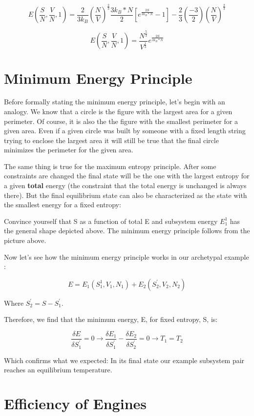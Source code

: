 \documentclass{article}
\newcommand{\pardif}[2]{\frac{\delta#1}{\delta#2}}
\newcommand{\bltz}{k_{B}}
\begin{document}
$$E(\frac{S}{N},\frac{V}{N},1)=\frac{2}{3\bltz}(\frac{N}{V})^{\frac{2}{3}}\frac{3\bltz*N}{2}[e^{\frac{2S}{3\bltz*N}}-1]-\frac{2}{3}(\frac{-3}{2})(\frac{N}{V})^\frac{2}{3}$$

$$E(\frac{S}{N},\frac{V}{N},1)=\frac{N^{\frac{5}{3}}}{V^{\frac{1}{3}}}e^{\frac{2S}{3\bltz*N}}$$

\section{Minimum Energy Principle}

Before formally stating the minimum energy principle, let's begin with an analogy.  We know that a circle is the figure with the largest area for a given perimeter.  Of course, it is also the the figure with the smallest perimeter for a given area.  Even if a given circle was built by someone with a fixed length string trying to enclose the largest area it will still be true that the final circle minimizes the perimeter for the given area.  

The same thing is true for the maximum entropy principle.  After some constraints are changed the final state will be the one with the largest entropy for a given \textbf{total} energy (the constraint that the total energy is unchanged is always there).  But the final equilibrium state can also be characterized as the state with the smallest energy for a fixed entropy:


Convince yourself that S as a function of total E and subsystem energy $E_{1}^{1}$ has the general shape depicted above.  The minimum energy principle follows from the picture above.  

Now let's see how the minimum energy principle works in our archetypal example   :


$$E=E_{1}(S_{1}^{1},V_{1},N_{1})+E_{2}(S_{2}^{'},V_{2},N_{2})$$

Where $S_{2}^{'}=S-S_{1}^{'}$.

Therefore, we find that the minimum energy, E, for fixed entropy, S, is:

$$\pardif{E}{S_{1}^{'}}=0 \rightarrow \pardif{E_{1}}{S_{1}^{'}}-\pardif{E_{2}}{S_{2}^{'}}=0 \rightarrow T_{1}=T_{2}$$

Which confirms what we expected: In its final state our example subsystem pair reaches an equilibrium temperature.

\section{Efficiency of Engines}
\end{document}
